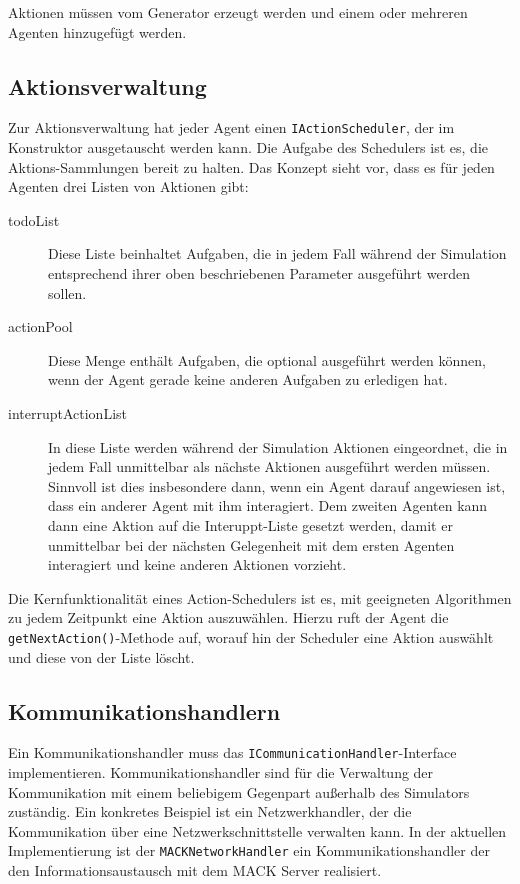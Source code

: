 Aktionen müssen vom Generator erzeugt werden und einem oder mehreren Agenten hinzugefügt werden.

\subsection{Aktionsverwaltung}\label{subsec:concept_actionhandling}
Zur Aktionsverwaltung hat jeder Agent einen \texttt{IActionScheduler}, der im Konstruktor ausgetauscht werden kann. Die Aufgabe des Schedulers ist es, die Aktions-Sammlungen bereit zu halten. Das Konzept sieht vor, dass es für jeden Agenten drei Listen von Aktionen gibt:
\begin{description}
	\item[todoList] Diese Liste beinhaltet Aufgaben, die in jedem Fall während der Simulation entsprechend ihrer oben beschriebenen Parameter ausgeführt werden sollen.
	\item[actionPool] Diese Menge enthält Aufgaben, die optional ausgeführt werden können, wenn der Agent gerade keine anderen Aufgaben zu erledigen hat.
	\item[interruptActionList] In diese Liste werden während der Simulation Aktionen eingeordnet, die in jedem Fall unmittelbar als nächste Aktionen ausgeführt werden müssen. Sinnvoll ist dies insbesondere dann, wenn ein Agent darauf angewiesen ist, dass ein anderer Agent mit ihm interagiert. Dem zweiten Agenten kann dann eine Aktion auf die Interuppt-Liste gesetzt werden, damit er unmittelbar bei der nächsten Gelegenheit mit dem ersten Agenten interagiert und keine anderen Aktionen vorzieht.
\end{description}

Die Kernfunktionalität eines Action-Schedulers ist es, mit geeigneten Algorithmen zu jedem Zeitpunkt eine Aktion auszuwählen. Hierzu ruft der Agent die \texttt{getNextAction()}-Methode auf, worauf hin der Scheduler eine Aktion auswählt und diese von der Liste löscht.


\subsection{Kommunikationshandlern}\label{subsec:concept_communication}
Ein Kommunikationshandler muss das \texttt{ICommunicationHandler}-Interface implementieren. Kommunikationshandler sind für die Verwaltung der Kommunikation mit einem beliebigem Gegenpart außerhalb des Simulators zuständig. Ein konkretes Beispiel ist ein Netzwerkhandler, der die Kommunikation über eine Netzwerkschnittstelle verwalten kann. In der aktuellen Implementierung ist der \texttt{MACKNetworkHandler} ein Kommunikationshandler der den Informationsaustausch mit dem MACK Server realisiert.

